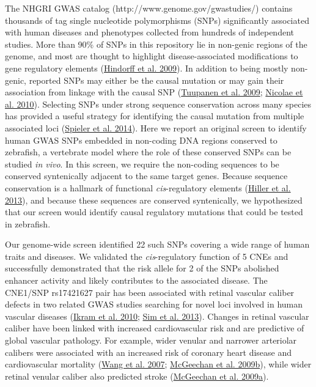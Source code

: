 \documentclass[]{article}
\begin{document}
The NHGRI GWAS catalog (http://www.genome.gov/gwastudies/) contains
thousands of tag single nucleotide polymorphisms (SNPs) significantly
associated with human diseases and phenotypes collected from hundreds of
independent studies. More than 90\% of SNPs in this repository lie in
non-genic regions of the genome, and most are thought to highlight
disease-associated modifications to gene regulatory elements
(\protect\hyperlink{_ENREF_8}{Hindorff et al. 2009}). In addition to
being mostly non-genic, reported SNPs may either be the causal mutation
or may gain their association from linkage with the causal SNP
(\protect\hyperlink{_ENREF_32}{Tuupanen et al. 2009};
\protect\hyperlink{_ENREF_22}{Nicolae et al. 2010}). Selecting SNPs
under strong sequence conservation across many species has provided a
useful strategy for identifying the causal mutation from multiple
associated loci (\protect\hyperlink{_ENREF_31}{Spieler et al. 2014}).
Here we report an original screen to identify human GWAS SNPs embedded
in non-coding DNA regions conserved to zebrafish, a vertebrate model
where the role of these conserved SNPs can be studied \emph{in vivo}. In
this screen, we require the non-coding sequences to be conserved
syntenically adjacent to the same target genes. Because sequence
conservation is a hallmark of functional \emph{cis}-regulatory elements
(\protect\hyperlink{_ENREF_7}{Hiller et al. 2013}), and because these
sequences are conserved syntenically, we hypothesized that our screen
would identify causal regulatory mutations that could be tested in
zebrafish.

Our genome-wide screen identified 22 such SNPs covering a wide range of
human traits and diseases. We validated the \emph{cis}-regulatory
function of 5 CNEs and successfully demonstrated that the risk allele
for 2 of the SNPs abolished enhancer activity and likely contributes to
the associated disease. The CNE1/SNP rs17421627 pair has been associated
with retinal vascular caliber defects in two related GWAS studies
searching for novel loci involved in human vascular diseases
(\protect\hyperlink{_ENREF_9}{Ikram et al. 2010};
\protect\hyperlink{_ENREF_29}{Sim et al. 2013}). Changes in retinal
vascular caliber have been linked with increased cardiovascular risk and
are predictive of global vascular pathology. For example, wider venular
and narrower arteriolar calibers were associated with an increased risk
of coronary heart disease and cardiovascular mortality
(\protect\hyperlink{_ENREF_34}{Wang et al. 2007};
\protect\hyperlink{_ENREF_20}{McGeechan et al. 2009b}), while wider
retinal venular caliber also predicted stroke
(\protect\hyperlink{_ENREF_19}{McGeechan et al. 2009a}).
\end{document}
